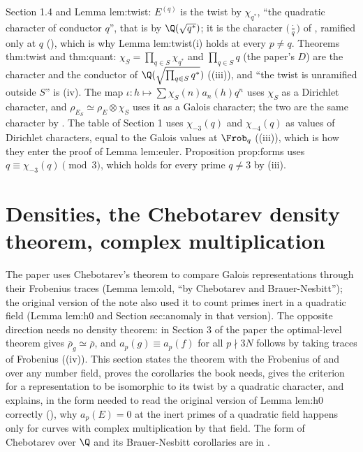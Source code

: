 \begin{paperlink}\label{pl:ant:twist}
Section 1.4 and Lemma lem:twist: $E^{(q)}$ is the twist by $\chi_{q^*}$, ``the quadratic character of conductor $q$'', that is by $\Q(\sqrt{q^*})$; it is the
character $\bigl(\frac\cdot q\bigr)$ of , ramified only at $q$ (), which is why Lemma lem:twist(i) holds at every
$p\ne q$. Theorems thm:twist and thm:quant: $\chi_S=\prod_{q\in S}\chi_{q^*}$ and $\prod_{q\in S}q$ (the paper's $D$) are the character and the conductor of
$\Q(\sqrt{\prod_{q\in S}q^*})$ ((iii)), and ``the twist is unramified outside $S$'' is (iv). The map
$\iota\colon h\mapsto\sum\chi_S(n)a_n(h)q^n$ uses $\chi_S$ as a Dirichlet character, and $\rho_{E_S}\simeq\rho_E\otimes\chi_S$ uses it as a Galois character; the
two are the same character by . The table of Section 1 uses $\chi_{-3}(q)$ and $\chi_{-4}(q)$ as values of Dirichlet characters,
equal to the Galois values at $\Frob_q$ ((iii)), which is how they enter the proof of Lemma lem:euler. Proposition prop:forms uses
$q\equiv\chi_{-3}(q)\pmod3$, which holds for every prime $q\ne3$ by (iii).
\end{paperlink}

\section[Densities, Chebotarev, complex multiplication]{Densities, the Chebotarev density theorem, complex multiplication}\label{sec:ant:chebotarev}

The paper uses Chebotarev's theorem to compare Galois representations through their Frobenius traces (Lemma lem:old, ``by Chebotarev and
Brauer-Nesbitt''); the original version of the note also used it to count primes inert in a quadratic field (Lemma lem:h0 and Section sec:anomaly in
that version). The opposite direction needs no density theorem: in Section 3 of the paper the optimal-level theorem gives $\bar\rho_g\simeq\bar\rho$, and
$a_p(g)\equiv a_p(f)$ for all $p\nmid3N$ follows by taking traces of Frobenius ((iv)). This section states the theorem with the Frobenius of
 and over any number field, proves the corollaries the book needs, gives the criterion for a representation to be isomorphic to its
twist by a quadratic character, and explains, in the form needed to read the original version of Lemma lem:h0 correctly (), why $a_p(E)=0$ at the inert primes of a quadratic field
happens only for curves with complex multiplication by that field. The form of Chebotarev over $\Q$ and its Brauer-Nesbitt corollaries are in
.

